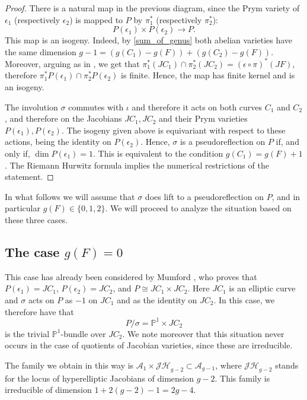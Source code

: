 \documentclass[preprint,12pt]{amsart}
\def\cA{\ensuremath{\mathcal{A}}}
\theoremstyle{plain}
\theoremstyle{definition}
\begin{document}
\begin{proof}
There is a natural map in the previous diagram, since the Prym variety of $\epsilon_1$ (respectively $\epsilon_2 $) is mapped to $P$ by $\pi_1^*$ (respectively $\pi_2^*$):
 \[
 P(\epsilon_1)\times P(\epsilon_2) \to P.
 \]
 This map is an isogeny. Indeed, by \eqref{sum_of_genus} both abelian varieties have the same dimension $g-1=(g(C_1)-g(F))+(g(C_2)-g(F))$. Moreover, arguing as in \cite[Lemma~4.4]{N}, we get that $\pi_1^*(JC_1) \cap \pi_2^*(JC_2)=(\epsilon \circ \pi)^*(JF)$, therefore $\pi_1^*P(\epsilon_1) \cap \pi_2^* P(\epsilon_2)$ is finite. Hence, the map has finite kernel and is an isogeny. 

The involution $\sigma $ commutes with $\iota $ and therefore it acts on both curves $C_1$ and $C_2$, and therefore on the Jacobians $JC_1, JC_2$ and their Prym varieties $P(\epsilon_1), P(\epsilon_2)$.
The isogeny given above is equivariant with respect to these actions, being the identity on $P(\epsilon_2)$.
Hence, $\sigma$ is a pseudoreflection on $P$ if, and only if, $\dim P(\epsilon_1)=1$.
This is equivalent to the condition $g(C_1)=g(F)+1$.
The Riemann Hurwitz formula implies the numerical restrictions of the statement.
\end{proof}

In what follows we will assume that $\sigma$ does lift to a pseudoreflection on $P$, and in particular $g(F)\in\{0,1,2\}$.
We will proceed to analyze the situation based on these three cases.
 
\subsection{The case \texorpdfstring{$g(F)=0$}{g(F)=0}}\label{g(F)=0}
This case has already been considered by Mumford \cite{M}, who proves that $P(\epsilon_1)=JC_1$, $P(\epsilon_2)=JC_2$, and $P\cong JC_1\times JC_2$.
Here $JC_1$ is an elliptic curve and $\sigma$ acts on $P$ as $-1$ on $JC_1$ and as the identity on $JC_2$.
In this case, we therefore have that
\[P/\sigma=\mathbb{P}^1\times JC_2\]
is the trivial $\mathbb{P}^1$-bundle over $JC_2$.
We note moreover that this situation never occurs in the case of quotients of Jacobian varieties, since these are irreducible.

The family we obtain in this way is $\cA_1 \times \mathcal {JH}_{g-2}\subset \cA_{g-1}$, where $\mathcal {JH}_{g-2}$ stands for the locus of hyperelliptic Jacobians of dimension $g-2$.
This family is irreducible of dimension $1+2(g-2)-1=2g-4$.
\end{document}

